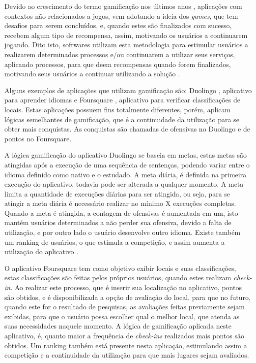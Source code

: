 \par Devido ao crescimento do termo gamificação nos últimos anos  \cite{groh2012gamification}, aplicações com contextos não relacionados a jogos, vem adotando a ideia dos \textit{games}, que tem desafios para serem concluídos, e, quando estes são finalizados com sucesso, recebem algum tipo de recompensa, assim, motivando os usuários a continuarem jogando. Dito isto, softwares utilizam esta metodologia para estimular usuários a realizarem determinados processos e/ou continuarem a utilizar seus serviços, aplicando processos, para que deem recompensas quando forem finalizados, motivando seus usuários a continuar utilizando a solução \cite{hamari2014does}.
\par Alguns exemplos de aplicações que utilizam gamificação são: Duolingo  \cite{melo2016eficiencia}, aplicativo para aprender idiomas e Foursquare \cite{huotari2012defining}, aplicativo para verificar classificações de locais. Estas aplicações possuem fins totalmente diferentes, porém, aplicam lógicas semelhantes de gamificação, que é a continuidade da utilização para se obter mais conquistas. As conquistas são chamadas de ofensivas no Duolingo e de pontos no Foursquare.
\par A lógica gamificação do aplicativo Duolingo se baseia em metas, estas metas são atingidas após a execução de uma sequência de sentenças, podendo variar entre o idioma definido como nativo e o estudado. A meta diária, é definida na primeira execução do aplicativo, todavia pode ser alterada a qualquer momento. A meta limita a quantidade de execuções diárias para ser atingida, ou seja, para se atingir a meta diária é necessário realizar no mínimo X execuções completas. Quando a meta é atingida, a contagem de ofensivas é aumentada em um, isto mantém usuários determinados a não perder sua ofensiva, devido a falta de utilização, e por outro lado o usuário desenvolve outro idioma. Existe também um ranking de usuários, o que estimula a competição, e assim aumenta a utilização do aplicativo \cite{melo2016eficiencia}.
\par O aplicativo Foursquare tem como objetivo exibir locais e suas classificações, estas classificações são feitas pelos próprios usuários, quando estes realizam \textit{check-in}. Ao realizar este processo, que é inserir sua localização no aplicativo, pontos são obtidos, e é disponibilizada a opção de avaliação do local, para que no futuro, quando este for o resultado de pesquisas, as avaliações feitas previamente sejam exibidas, para que o usuário possa escolher qual o melhor local, que atenda as suas necessidades naquele momento. A lógica de gamificação aplicada neste aplicativo, é, quanto maior a frequência de \textit{check-ins} realizados mais pontos são obtidos. Um ranking também está presente nesta aplicação, estimulando assim a competição e a continuidade da utilização para que mais lugares sejam avaliados\cite{huotari2012defining}.

